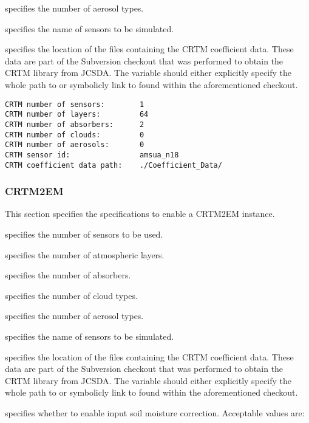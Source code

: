   specifies the number of aerosol types.

  specifies the name of sensors to be simulated.

  specifies the location of the files
 containing the CRTM coefficient data.  These data are part of the
 Subversion checkout that was performed to obtain the CRTM library
 from JCSDA.  The  variable should
 either explicitly specify the whole path to or symbolicly link to 
  found within the
 aforementioned checkout. 
 

 \begin{Verbatim}[frame=single]
CRTM number of sensors:        1
CRTM number of layers:         64
CRTM number of absorbers:      2
CRTM number of clouds:         0 
CRTM number of aerosols:       0 
CRTM sensor id:                amsua_n18  
CRTM coefficient data path:    ./Coefficient_Data/
 \end{Verbatim}
 

 \subsubsection{CRTM2EM} \label{ssec:crtm2em}
 This section specifies the specifications to enable a CRTM2EM instance.

  specifies the number of sensors
 to be used.

  specifies the number of atmospheric
 layers.

  specifies the number of absorbers.

  specifies the number of cloud types.

  specifies the number of aerosol types.

  specifies the name of sensors to be simulated.

  specifies the location of the files
 containing the CRTM coefficient data.  These data are part of the
 Subversion checkout that was performed to obtain the CRTM library
 from JCSDA.  The  variable should
 either explicitly specify the whole path to or symbolicly link to 
  found within the
 aforementioned checkout. 

  specifies whether to
 enable input soil moisture correction.
 Acceptable values are:

